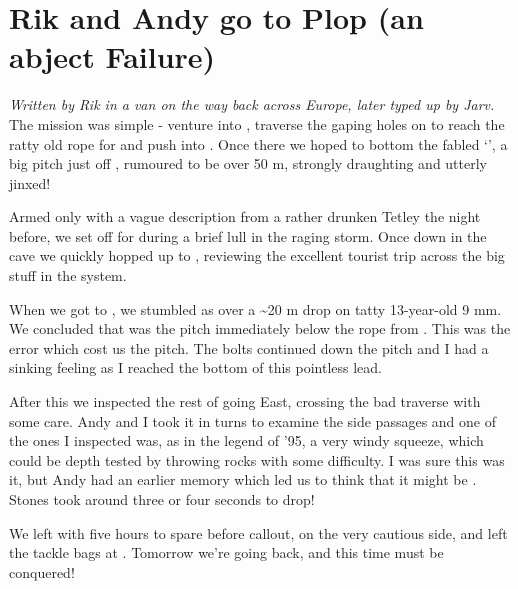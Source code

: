 \section{Rik and Andy go to Plop (an abject
Failure)}


\textit{Written by Rik in a van on the way back across Europe, later typed up by Jarv.}\\

The mission was simple - venture into , traverse the gaping
holes on  to reach the ratty old rope for 
and push into . Once there we hoped to bottom the fabled
`', a big pitch just off , rumoured to be over 50 m,
strongly draughting and utterly jinxed!

Armed only with a vague description from a rather drunken Tetley the
night before, we set off for  during a brief lull in the
raging storm. Once down in the cave we quickly hopped up to ,
reviewing the excellent tourist trip across the big stuff in the system.

When we got to , we stumbled as  over a \textasciitilde{}20 m drop on tatty 13-year-old 9
mm. We concluded that  was the pitch immediately below the rope from
. This was the error which cost us the pitch. The bolts continued
down the pitch and I had a sinking feeling as I reached the bottom of
this pointless lead.

After this we inspected the rest of  going East, crossing the
bad traverse with some care. Andy and I took it in turns to examine the
side passages and one of the ones I inspected was, as in the legend of
'95, a very windy squeeze, which could be depth tested by throwing rocks
with some difficulty. I was sure this was it, but Andy had an earlier
memory which led us to think that it might be . Stones took
around three or four seconds to drop!

We left with five hours to spare before callout, on the very cautious
side, and left the tackle bags at . Tomorrow we're going back,
and this time  must be conquered!

